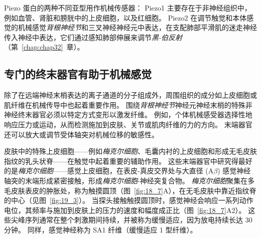 Piezo 蛋白的两种不同亚型用作机械传感器：
Piezo1 主要存在于非神经组织中，例如血管、肾脏和膀胱中的上皮细胞，以及红细胞。
Piezo2 在调节触觉和本体感觉的机械感觉\textit{背根神经节}和三叉神经神经元中表达，在支配肺部平滑肌的迷走神经传入神经中表达，它们通过感知肺部伸展来调节\textit{黑-伯反射}（第~\ref{chap:chap32}~章）。



\subsection{专门的终末器官有助于机械感觉}

除了在远端神经末梢表达的离子通道的分子组成外，周围组织的成分如上皮细胞或肌纤维在机械传导中也起着重要作用。
围绕\textit{背根神经节}神经元神经末梢的特殊非神经终末器官必须以特定方式变形以激发纤维。
例如，个体机械感受器选择性地响应压力或运动，从而检测施加到皮肤、关节或肌肉纤维的力的方向。
末端器官还可以放大或调节受体轴突对机械位移的敏感性。


皮肤中的特殊上皮细胞——例如\textit{梅克尔细胞}、毛囊内衬的上皮细胞和形成无毛皮肤指纹的乳头状脊——在触觉中起着重要的辅助作用。
这些末端器官中研究得最好的是\textit{梅克尔细胞}——感觉上皮细胞，在表皮-真皮交界处与大直径 (A$\beta$) 感觉神经轴突的末端形成紧密接触，形成\textit{梅克尔细胞}-神经突复合物。
\textit{梅克尔细胞}聚集在多毛皮肤表皮的肿胀处，称为触摸圆顶（图~\ref{fig:18_7}A），在无毛皮肤中靠近指纹脊的中心（见图~\ref{fig:19_3}）。
当探头接触触摸圆顶时，感觉神经会响应一系列动作电位，其频率与施加到皮肤上的压力的速度和幅度成正比（图~\ref{fig:18_7}A2）。
这些尖峰序列通常在整个刺激期间持续，并被称为缓慢适应，因为放电持续长达 30 分钟。
同样，感觉神经称为 SA1 纤维（缓慢适应 1 型纤维）。


